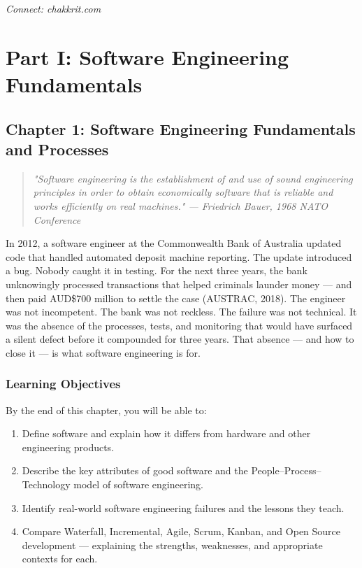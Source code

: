 \documentclass[11pt,a4paper]{book}
\begin{document}
\medskip

\textit{Connect: chakkrit.com}

\part{Part I: Software Engineering Fundamentals}


\chapter{Chapter 1: Software Engineering Fundamentals and Processes}

\begin{quote}
\textit{\textit{"Software engineering is the establishment of and use of sound engineering principles in order to obtain economically software that is reliable and works efficiently on real machines."} --- Friedrich Bauer, 1968 NATO Conference}
\end{quote}

\medskip

In 2012, a software engineer at the Commonwealth Bank of Australia updated code that handled automated deposit machine reporting. The update introduced a bug. Nobody caught it in testing. For the next three years, the bank unknowingly processed transactions that helped criminals launder money --- and then paid AUD\$700 million to settle the case (AUSTRAC, 2018). The engineer was not incompetent. The bank was not reckless. The failure was not technical. It was the absence of the processes, tests, and monitoring that would have surfaced a silent defect before it compounded for three years. That absence --- and how to close it --- is what software engineering is for.

\medskip

\section{Learning Objectives}

By the end of this chapter, you will be able to:

\begin{enumerate}
  \item Define software and explain how it differs from hardware and other engineering products.
  \item Describe the key attributes of good software and the People--Process--Technology model of software engineering.
  \item Identify real-world software engineering failures and the lessons they teach.
  \item Compare Waterfall, Incremental, Agile, Scrum, Kanban, and Open Source development --- explaining the strengths, weaknesses, and appropriate contexts for each.
\end{enumerate}
\end{document}
